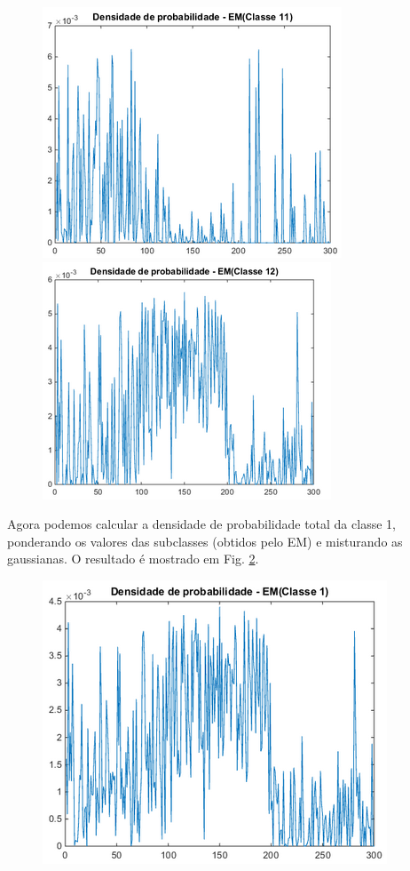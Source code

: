 \documentclass[12pt,twoside]{report}
\newcommand{\figureref}[1]{Fig. \ref{fig:#1}}
\begin{document}
\begin{figure}[H]
    \centering
    \begin{minipage}[b]{0.45\linewidth}
        \includegraphics[scale=0.7]{pdf_em_c11}
        \caption{}
        \label{fig:pdf_em_c11}
    \end{minipage}
    \hfill
    \begin{minipage}[b]{0.45\linewidth}
        \includegraphics[scale=0.7]{pdf_em_c12}
        \caption{}
        \label{fig:pdf_em_c12}
    \end{minipage}
\end{figure}

Agora podemos calcular a densidade de probabilidade total da classe 1, ponderando
os valores das subclasses (obtidos pelo EM) e misturando as gaussianas. O resultado
é mostrado em \figureref{pdf_em_c1}.

\begin{figure}[ht]
    \centering
    \includegraphics[scale=0.7]{pdf_em_c1}
    \caption{}
    \label{fig:pdf_em_c1}
\end{figure}
\end{document}
